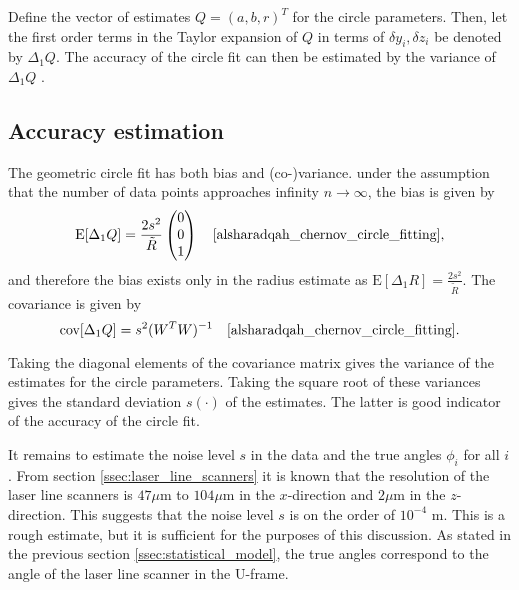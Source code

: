 Define the vector of estimates $Q = (a, b, r)^T$ for the circle parameters. Then, let the first order terms in the Taylor expansion of $Q$ in terms of $\delta y_i, \delta z_i$ be denoted by $\Delta_1Q$. The accuracy of the circle fit can then be estimated by the variance of $\Delta_1Q$ \cite[section 2]{alsharadqah_chernov_circle_fitting}.

\subsection{Accuracy estimation}
The geometric circle fit has both bias and (co-)variance. under the assumption that the number of data points approaches infinity $n \rightarrow \infty$, the bias is given by
\begin{equation}
    \text{E}[\Delta_1 Q] = \frac{2s^2}{\tilde{R}} \begin{pmatrix} 0 \\ 0 \\ 1 \end{pmatrix} \quad \text{\cite[equation 6.14]{alsharadqah_chernov_circle_fitting}},
    \label{eq:circle_fit_bias}
\end{equation}
and therefore the bias exists only in the radius estimate as $\text{E}[\Delta_1 R] =\frac{2s^2}{\tilde{R}}$. The covariance is given by
\begin{equation}
    \text{cov}[\Delta_1 Q] = s^2 (W^T W)^{-1} \quad \text{\cite[equation 8.12]{alsharadqah_chernov_circle_fitting}}.
    \label{eq:circle_fit_variance}
\end{equation}

Taking the diagonal elements of the covariance matrix gives the variance of the estimates for the circle parameters. Taking the square root of these variances gives the standard deviation $s(\cdot)$ of the estimates. The latter is good indicator of the accuracy of the circle fit.

It remains to estimate the noise level $s$ in the data and the true angles $\phi_i$ for all $i$. From section \ref{ssec:laser_line_scanners} it is known that the resolution of the laser line scanners is $47 \mu$m to $104 \mu$m in the $x$-direction and $2 \mu$m in the $z$-direction. This suggests that the noise level $s$ is on the order of $10^{-4}$ m. This is a rough estimate, but it is sufficient for the purposes of this discussion. As stated in the previous section \ref{ssec:statistical_model}, the true angles correspond to the angle of the laser line scanner in the U-frame.

